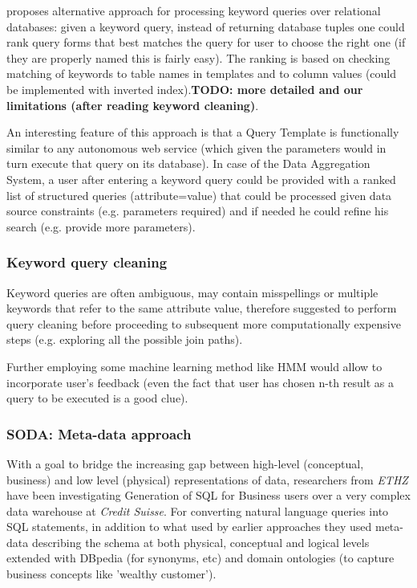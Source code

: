 \cite{forms_kws} proposes alternative approach for processing keyword queries over relational databases: given a keyword query, instead of returning database tuples one could rank query forms that best matches the query for user to choose the right one (if they are properly named this is fairly easy). The ranking is based on checking matching of keywords to table names in templates and to column values (could be implemented with inverted index).\textbf{\color{red}TODO: more detailed and our limitations (after reading keyword cleaning)}.

An interesting feature of this approach is that a Query Template is functionally similar to any autonomous web service (which given the parameters would in turn execute that query on its database).  In case of the Data Aggregation System, a user after entering a keyword query could be provided with a ranked list of structured queries (attribute=value) that could be processed given data source constraints (e.g. parameters required) and if needed he could refine his search (e.g. provide more parameters).


\subsubsection*{Keyword query cleaning}
Keyword queries are often ambiguous, may contain misspellings or multiple keywords that refer to the same attribute value,  therefore \cite{kw_cleaning} suggested to perform query cleaning before proceeding to subsequent more computationally expensive steps (e.g. exploring all the possible join paths).

Further employing some machine learning method like HMM\cite{kw_cleaning_hmm} would allow to incorporate user's feedback (even the fact that user has chosen n-th result as a query to be executed is a good clue).


\subsubsection*{SODA: Meta-data approach}

With a goal to bridge the increasing gap between high-level (conceptual, business) and low level (physical) representations of data, researchers from \textit{ETHZ} have been investigating Generation of SQL for Business users over a very complex data warehouse at \textit{Credit Suisse}.  For converting natural language queries 
 into SQL statements, in addition to what used by earlier approaches they used meta-data describing the schema at both physical, conceptual and logical levels extended with DBpedia (for synonyms, etc) and domain ontologies (to capture business concepts like 'wealthy customer').

